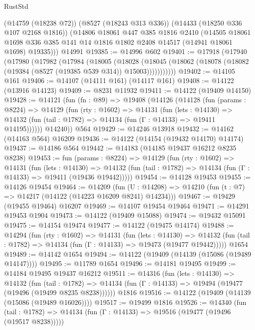 \begin{lexlean}{RustStd}
\begin{coremodule}
      (@14759 (@18238 @72))
      (@8527 (@18243 @313 @336))
      (@14433 (@18250 @336 @107 @2168 @1816))
      (@14806
        @18061
        @447
        @385
        @1816
        @2410
        (@14505
          @18061
          @1698
          @336
          @385
          @141
          @14
          @1816
          @1802
          @2408
          @14517
          (@14941 @18061 @1698)
          @19335)))
    @14991
@19385 := @14996 @602
@19401 := @17918
    (@17940
      (@17980
        (@17982
          (@17984
            (@18005
              (@18028
                (@18045 (@18062 (@18078 (@18082 (@19384 (@8527 (@19385 @539 @314)) @15003)))))))))))
@19402 := @14105 @161
@19406 := @14107 (@14111 @161) (@14117 @161)
@19408 := @14122 (@13916 @14123)
@19409 := @8231 @11932
@19411 := @14122 (@19409 @14150)
@19428 := @14121
    (fun (fn : @89) =>
    @19408
      (@14126
        (@14128
          (fun (params : @8224) =>
          @14129
            (fun (rty : @1602) =>
            @14131
              (fun (lets : @14130) =>
              @14132 (fun (tail : @1782) => @14134 (fun (Γ : @14133) => @19411 @14195))))))
        @14240))
    @564
@19429 := @14246 @13918
@19432 := @14162 (@14163 @564) @16209
@19436 := @14122 (@14154 (@19432 @14170) @14174)
@19437 := @14186 @564
@19442 := @14183 (@14185 @19437 @16212 @8235 @8238)
@19453 := fun (params : @8224) =>
  @14129
    (fun (rty : @1602) =>
    @14131
      (fun (lets : @14130) =>
      @14132 (fun (tail : @1782) => @14134 (fun (Γ : @14133) => @19411 (@19436 @19442)))))
@19454 := @14128 @19453
@19455 := @14126 @19454
@19464 := @14209
    (fun (U : @14208) => @14210 (fun (t : @7) => @14217 (@14122 (@14223 @16209 @8241) @14234)))
@19467 := @19429 (@19455 @19464) @16207
@19469 := @14107 @19454 @19464
@19471 := @14291 @19453 @1904
@19473 := @14122 (@19409 @15088)
@19474 := @19432 @15091
@19475 := @14154 @19474
@19477 := @14122 (@19475 @14174)
@19488 := @14294
    (fun (rty : @1602) =>
    @14131
      (fun (lets : @14130) =>
      @14132 (fun (tail : @1782) => @14134 (fun (Γ : @14133) => @19473 (@19477 @19442)))))
    @1654
@19489 := @14142 @1654
@19494 := @14122 (@19409 (@14139 (@15086 (@19489 @14147))))
@19495 := @11789 @1654
@19496 := @14181 @19495
@19499 := @14184 @19495 @19437 @16212
@19511 := @14316
    (fun (lets : @14130) =>
    @14132
      (fun (tail : @1782) =>
      @14134 (fun (Γ : @14133) => @19494 (@19477 (@19496 (@19499 @8235 @8238))))))
    @1816
@19516 := @14122 (@19409 (@14139 (@15086 (@19489 @16026))))
@19517 := @19499 @1816
@19526 := @14340
    (fun (tail : @1782) => @14134 (fun (Γ : @14133) => @19516 (@19477 (@19496 (@19517 @8238)))))

\end{coremodule}
\end{lexlean}
